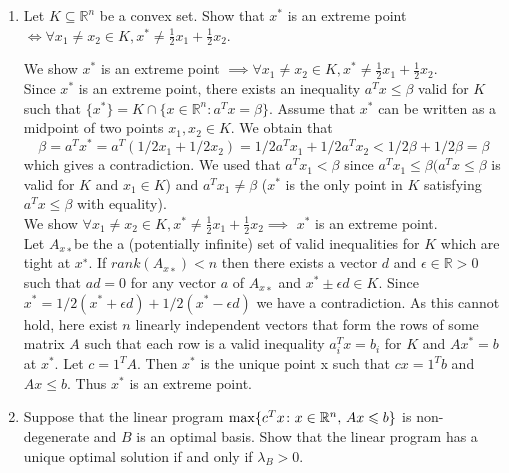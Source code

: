 \documentclass[11pt]{article}
\institute{\'Ecole Polytechnique F\'ed\'erale de Lausanne}
\newcommand{\setR}{\mathbb{R}}
\renewcommand{\leq}{\leqslant}
\begin{document}
\makeheader

\begin{enumerate}[1)]
\item Let $K \subseteq \setR^n$ be a convex set. Show that $x^\ast$ is an extreme point $\iff \forall x_1 \neq x_2 \in K, x^\ast \neq \frac{1}{2}x_1 + \frac{1}{2}x_2$. 


\begin{solution}
We show $x^\ast$ is an extreme point $\implies \forall x_1 \neq x_2 \in K, x^\ast \neq \frac{1}{2}x_1 + \frac{1}{2}x_2$.
\\

Since $x^\ast$ is an extreme point, there exists an inequality $a^T x≤β$ valid for $K$ such that $\{x^\ast\}= K∩\{x∈
\setR^n : a^T x= β\}$. Assume that $x^\ast$ can be written as a midpoint of two points $x_1,x_2∈K$. We obtain
that
$$β= a^T x^\ast= a^T (1/2x_1+ 1/2x_2) = 1/2a^T x_1+ 1/2a^T x_2 <1/2β+ 1/2 β= β$$
which gives a contradiction. We used that $a^T x_1 < β$ since $a^T x_1 ≤β (a^T x ≤β$ is valid for $K$ and $x_1 ∈K$) and $a^T x_1\neq β$ ($x^\ast$ is the only point in $K$ satisfying $a^T x≤β$ with equality).\\



We show $\forall x_1 \neq x_2 \in K, x^\ast \neq \frac{1}{2}x_1 + \frac{1}{2}x_2 \implies $ $x^\ast$ is an extreme point. \\


Let $A_{x∗} $be the a (potentially infinite) set of valid inequalities for $K$ which
are tight at $x^∗$. If $rank(A_{x∗} ) < n$ then there exists a vector $d$ and $\epsilon ∈\setR>0$ such that $ad = 0$ for
any vector $a$ of $A_{x∗}$ and $x^\ast ±\epsilon d \in K$. Since $x^\ast=  1/2(x^\ast + \epsilon d) + 1/2(x^\ast
−\epsilon d)$ we have a contradiction. As this cannot hold, here exist $n$ linearly independent vectors that form the rows of some matrix $A$ such that each row is a valid inequality $a_i^T x = b_i$ for $K$ and $Ax^\ast = b$ at $x^\ast$. Let $c= 1^T A$. Then $x^\ast$ is the unique point x such that $cx= 1^T b$ and $Ax≤b$. Thus $x^\ast$ is an extreme point.

\end{solution}


\item Suppose that the linear program $\max \{c^Tx \colon x \in \R^n, \, Ax \leq b\}$ is non-degenerate and $B$ is an optimal basis. Show that the linear program has a unique optimal solution if and only if $\lambda_B>0$. 



\end{enumerate}
\end{document}
